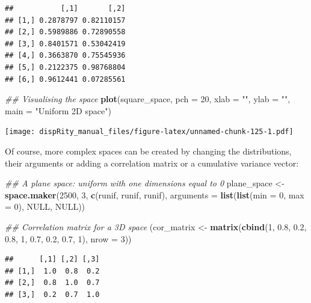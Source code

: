 \documentclass[]{book}
\newenvironment{Shaded}{\begin{snugshade}}{\end{snugshade}}
\newcommand{\CommentTok}[1]{\textcolor[rgb]{0.56,0.35,0.01}{\textit{#1}}}
\newcommand{\DataTypeTok}[1]{\textcolor[rgb]{0.13,0.29,0.53}{#1}}
\newcommand{\DecValTok}[1]{\textcolor[rgb]{0.00,0.00,0.81}{#1}}
\newcommand{\FloatTok}[1]{\textcolor[rgb]{0.00,0.00,0.81}{#1}}
\newcommand{\KeywordTok}[1]{\textcolor[rgb]{0.13,0.29,0.53}{\textbf{#1}}}
\newcommand{\NormalTok}[1]{#1}
\newcommand{\OtherTok}[1]{\textcolor[rgb]{0.56,0.35,0.01}{#1}}
\newcommand{\StringTok}[1]{\textcolor[rgb]{0.31,0.60,0.02}{#1}}
\begin{document}
\begin{verbatim}
##           [,1]       [,2]
## [1,] 0.2878797 0.82110157
## [2,] 0.5989886 0.72890558
## [3,] 0.8401571 0.53042419
## [4,] 0.3663870 0.75545936
## [5,] 0.2122375 0.98768804
## [6,] 0.9612441 0.07285561
\end{verbatim}

\begin{Shaded}
\begin{Highlighting}[]
\CommentTok{## Visualising the space}
\KeywordTok{plot}\NormalTok{(square_space, }\DataTypeTok{pch =} \DecValTok{20}\NormalTok{, }\DataTypeTok{xlab =} \StringTok{""}\NormalTok{, }\DataTypeTok{ylab =} \StringTok{""}\NormalTok{,}
     \DataTypeTok{main =} \StringTok{"Uniform 2D space"}\NormalTok{)}
\end{Highlighting}
\end{Shaded}

\texttt{[image: dispRity\_manual\_files/figure-latex/unnamed-chunk-125-1.pdf]}

Of course, more complex spaces can be created by changing the distributions, their arguments or adding a correlation matrix or a cumulative variance vector:

\begin{Shaded}
\begin{Highlighting}[]
\CommentTok{## A plane space: uniform with one dimensions equal to 0}
\NormalTok{plane_space <-}\StringTok{ }\KeywordTok{space.maker}\NormalTok{(}\DecValTok{2500}\NormalTok{, }\DecValTok{3}\NormalTok{, }\KeywordTok{c}\NormalTok{(runif, runif, runif),}
                           \DataTypeTok{arguments =} \KeywordTok{list}\NormalTok{(}\KeywordTok{list}\NormalTok{(}\DataTypeTok{min =} \DecValTok{0}\NormalTok{, }\DataTypeTok{max =} \DecValTok{0}\NormalTok{),}
                           \OtherTok{NULL}\NormalTok{, }\OtherTok{NULL}\NormalTok{))}

\CommentTok{## Correlation matrix for a 3D space}
\NormalTok{(cor_matrix <-}\StringTok{ }\KeywordTok{matrix}\NormalTok{(}\KeywordTok{cbind}\NormalTok{(}\DecValTok{1}\NormalTok{, }\FloatTok{0.8}\NormalTok{, }\FloatTok{0.2}\NormalTok{, }\FloatTok{0.8}\NormalTok{, }\DecValTok{1}\NormalTok{, }\FloatTok{0.7}\NormalTok{, }\FloatTok{0.2}\NormalTok{, }\FloatTok{0.7}\NormalTok{, }\DecValTok{1}\NormalTok{), }\DataTypeTok{nrow =} \DecValTok{3}\NormalTok{))}
\end{Highlighting}
\end{Shaded}

\begin{verbatim}
##      [,1] [,2] [,3]
## [1,]  1.0  0.8  0.2
## [2,]  0.8  1.0  0.7
## [3,]  0.2  0.7  1.0
\end{verbatim}
\end{document}
